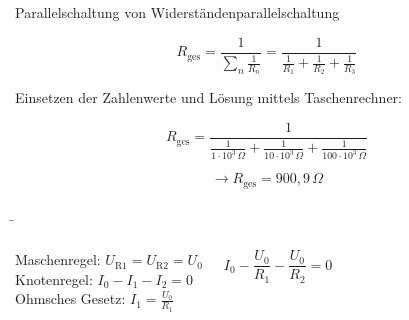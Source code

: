 \begin{frame}
{\begin{bsp}{Parallelschaltung von Widerständen}{parallelschaltung}
			
			
			\begin{equation*}
				R_\mathrm{ges} = \frac{1}{\sum_{n} \frac{1}{R_n}} = \frac{1}{\frac{1}{R_1} + \frac{1}{R_2}+ \frac{1}{R_3}}
			\end{equation*}
			
			Einsetzen der Zahlenwerte und Lösung mittels Taschenrechner:
			
			\begin{equation*}
				R_\mathrm{ges} = \frac{1}{\frac{1}{1\cdot 10^3 \, \Omega} + \frac{1}{10\cdot 10^3 \, \Omega} + \frac{1}{100 \cdot 10^3 \, \Omega}}
			\end{equation*}
			
			\begin{equation*}
				\rightarrow R_\mathrm{ges} = 900,9 \, \Omega
			\end{equation*}
			
			
			
			
		\end{bsp}
		
		
	}
	
	\b{
		\begin{columns}
			
			Maschenregel: $U_\mathrm{R1} = U_\mathrm{R2} = U_0$\\
			
			Knotenregel: $I_0 - I_1 - I_2 = 0$\\
			
			Ohmsches Gesetz: $I_1 = \frac{U_0}{R_1}$ %
			
			
			\begin{equation*}
				I_0 - \frac{U_0}{R_1} - \frac{U_0}{R_2} = 0
			\end{equation*}
			
			
			
			
			
			
			
			
			
			

\end{columns}}
\end{frame}

